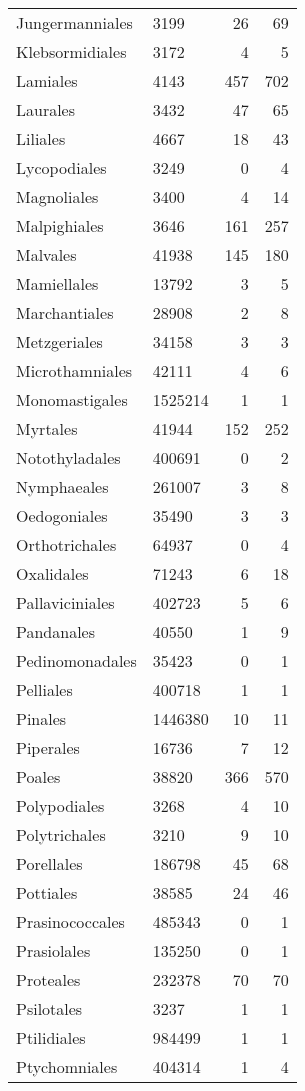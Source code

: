 \documentclass{article}
\begin{document}
\begin{longtabu}{lXRR}
Jungermanniales & 3199 & 26 & 69\\
Klebsormidiales & 3172 & 4 & 5\\
Lamiales & 4143 & 457 & 702\\
Laurales & 3432 & 47 & 65\\
Liliales & 4667 & 18 & 43\\
Lycopodiales & 3249 & 0 & 4\\
Magnoliales & 3400 & 4 & 14\\
Malpighiales & 3646 & 161 & 257\\
Malvales & 41938 & 145 & 180\\
Mamiellales & 13792 & 3 & 5\\
Marchantiales & 28908 & 2 & 8\\
Metzgeriales & 34158 & 3 & 3\\
Microthamniales & 42111 & 4 & 6\\
Monomastigales & 1525214 & 1 & 1\\
Myrtales & 41944 & 152 & 252\\
Notothyladales & 400691 & 0 & 2\\
Nymphaeales & 261007 & 3 & 8\\
Oedogoniales & 35490 & 3 & 3\\
Orthotrichales & 64937 & 0 & 4\\
Oxalidales & 71243 & 6 & 18\\
Pallaviciniales & 402723 & 5 & 6\\
Pandanales & 40550 & 1 & 9\\
Pedinomonadales & 35423 & 0 & 1\\
Pelliales & 400718 & 1 & 1\\
Pinales & 1446380 & 10 & 11\\
Piperales & 16736 & 7 & 12\\
Poales & 38820 & 366 & 570\\
Polypodiales & 3268 & 4 & 10\\
Polytrichales & 3210 & 9 & 10\\
Porellales & 186798 & 45 & 68\\
Pottiales & 38585 & 24 & 46\\
Prasinococcales & 485343 & 0 & 1\\
Prasiolales & 135250 & 0 & 1\\
Proteales & 232378 & 70 & 70\\
Psilotales & 3237 & 1 & 1\\
Ptilidiales & 984499 & 1 & 1\\
Ptychomniales & 404314 & 1 & 4\\

\end{longtabu}
\end{document}
